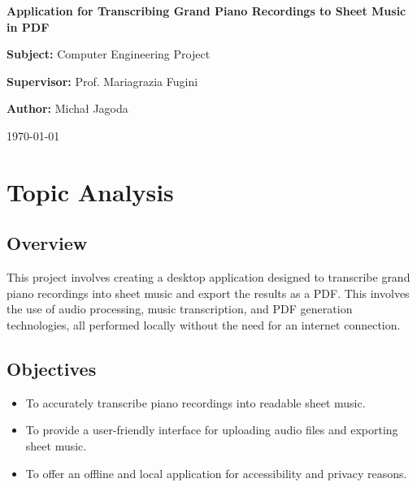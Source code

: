 \documentclass{article}
\begin{document}
\begin{titlepage}
    \centering
    \vspace*{2cm} %
    {\Huge \bfseries Application for Transcribing Grand Piano Recordings to Sheet Music in PDF\par}
    \vspace{8cm}
    {\Large \textbf{Subject:} Computer Engineering Project\par}
    \vspace{0.5cm}
    {\Large \textbf{Supervisor:} Prof. Mariagrazia Fugini\par}
    \vspace{0.5cm}
    {\Large \textbf{Author:} Michał Jagoda\par}
    \vspace{0.5cm}
    {\Large \today\par}
    \vfill
\end{titlepage}

\clearpage %
\tableofcontents
\clearpage %

\section{Topic Analysis}

\subsection{Overview}
This project involves creating a desktop application designed to transcribe grand piano recordings into sheet music and export the results as a PDF. This involves the use of audio processing, music transcription, and PDF generation technologies, all performed locally without the need for an internet connection.

\subsection{Objectives}
\begin{itemize}
    \item To accurately transcribe piano recordings into readable sheet music.
    \item To provide a user-friendly interface for uploading audio files and exporting sheet music.
    \item To offer an offline and local application for accessibility and privacy reasons.
\end{itemize}
\end{document}
